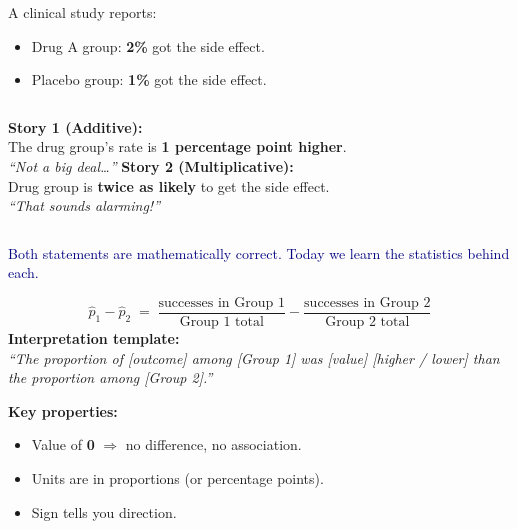 \documentclass[aspectratio=169, 11pt]{beamer}
\begin{document}
\begin{frame}[t, plain]
  \vspace{0.3cm}
  A clinical study reports:
  \begin{itemize}
    \item Drug A group: \textbf{2\%} got the side effect.
    \item Placebo group: \textbf{1\%} got the side effect.
  \end{itemize}
  \vspace{0.5cm}
  \begin{columns}
      \textbf{Story 1 (Additive):}\\
      The drug group's rate is \textbf{1 percentage point higher}.\\[0.4cm]
      \textit{``Not a big deal\ldots''}
      \textbf{Story 2 (Multiplicative):}\\
      Drug group is \textbf{twice as likely} to get the side effect.\\[0.4cm]
      \textit{``That sounds alarming!''}
  \end{columns}
  \vspace{0.6cm}
  \textcolor{navy}{\small Both statements are mathematically correct. Today we learn the statistics behind each.}
\end{frame}

\begin{frame}[t, plain]
  \vspace{0.3cm}
  \[
    \hat{p}_1 - \hat{p}_2 \;=\;
    \frac{\text{successes in Group 1}}{\text{Group 1 total}}
    -
    \frac{\text{successes in Group 2}}{\text{Group 2 total}}
  \]
  \vspace{0.3cm}
  \textbf{Interpretation template:}\\[0.2cm]
  \textit{``The proportion of [outcome] among [Group 1] was [value] [higher / lower] than the
  proportion among [Group 2].''}

  \vspace{0.5cm}
  \textbf{Key properties:}
  \begin{itemize}
    \item Value of \textbf{0} $\Rightarrow$ no difference, no association.
    \item Units are in proportions (or percentage points).
    \item Sign tells you direction.
  \end{itemize}
\end{frame}
\end{document}
